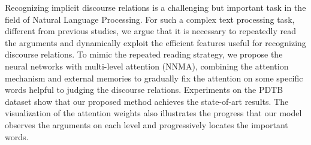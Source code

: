 Recognizing implicit discourse relations is a challenging but important task in the field of Natural Language Processing. For such a complex text processing task, different from previous studies, we argue that it is necessary to repeatedly read the arguments and dynamically exploit the efficient features useful for recognizing discourse relations. To mimic the repeated reading strategy, we propose the neural networks with multi-level attention (NNMA), combining the attention mechanism and external memories to gradually fix the attention on some specific words helpful to judging the discourse relations. Experiments on the PDTB dataset show that our proposed method achieves the state-of-art results. The visualization of the attention weights also illustrates the progress that our model observes the arguments on each level and progressively locates the important words.

